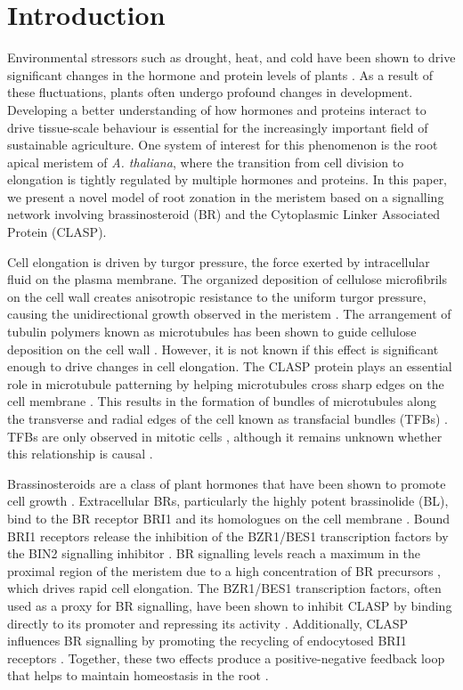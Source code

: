 \documentclass[referee,pdflatex,sn-mathphys-num]{sn-jnl}
\begin{document}
\section{Introduction}\label{sec1}

Environmental stressors such as drought, heat, and cold have been shown to drive significant changes in the hormone and protein levels of plants \cite{halat2020}. As a result of these fluctuations, plants often undergo profound changes in development. Developing a better understanding of how hormones and proteins interact to drive tissue-scale behaviour is essential for the increasingly important field of sustainable agriculture. One system of interest for this phenomenon is the root apical meristem of \emph{A. thaliana}, where the transition from cell division to elongation is tightly regulated by multiple hormones and proteins. In this paper, we present a novel model of root zonation in the meristem based on a signalling network involving brassinosteroid (BR) and the Cytoplasmic Linker Associated Protein (CLASP).

Cell elongation is driven by turgor pressure, the force exerted by intracellular fluid on the plasma membrane. The organized deposition of cellulose microfibrils on the cell wall creates anisotropic resistance to the uniform turgor pressure, causing the unidirectional growth observed in the meristem \cite{hamant2010}. The arrangement of tubulin polymers known as microtubules has been shown to guide cellulose deposition on the cell wall \cite{hamant2010}. However, it is not known if this effect is significant enough to drive changes in cell elongation. The CLASP protein plays an essential role in microtubule patterning by helping microtubules cross sharp edges on the cell membrane \cite{ambrose2011}. This results in the formation of bundles of microtubules along the transverse and radial edges of the cell known as transfacial bundles (TFBs) \cite{halat2022}. TFBs are only observed in mitotic cells \cite{ambrose2011}, although it remains unknown whether this relationship is causal \cite{halat2022}. 

Brassinosteroids are a class of plant hormones that have been shown to promote cell growth \cite{ackerman-lavert2020}. Extracellular BRs, particularly the highly potent brassinolide (BL), bind to the BR receptor BRI1 and its homologues on the cell membrane \cite{vukasinovic2021}. Bound BRI1 receptors release the inhibition of the BZR1/BES1 transcription factors by the BIN2 signalling inhibitor \cite{ackerman-lavert2020}. BR signalling levels reach a maximum in the proximal region of the meristem due to a high concentration of BR precursors \cite{vukasinovic2021}, which drives rapid cell elongation. The BZR1/BES1 transcription factors, often used as a proxy for BR signalling, have been shown to inhibit CLASP by binding directly to its promoter and repressing its activity \cite{ruan2018}. Additionally, CLASP influences BR signalling by promoting the recycling of endocytosed BRI1 receptors \cite{ruan2018}. Together, these two effects produce a positive-negative feedback loop that helps to maintain homeostasis in the root \cite{ruan2018}.
\end{document}
